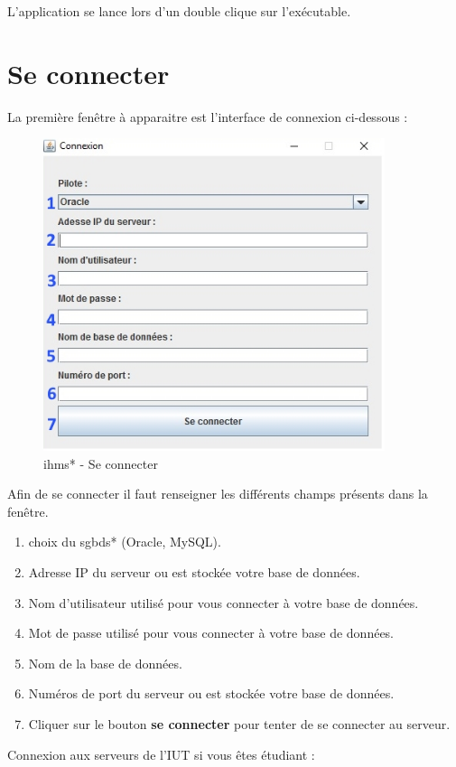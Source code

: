 L'application se lance lors d'un double clique sur l'exécutable.

\section{Se connecter}
La première fen\^etre à apparaitre est l'interface de connexion ci-dessous :
\begin{figure}[!h]
\centering
\includegraphics[width=10cm]{./images/manuel/se_connecter.jpg}
\caption{\glspl{ihm}* - Se connecter}
\label{se_connecter}
\end{figure}

Afin de se connecter il faut renseigner les différents champs présents dans la fen\^etre.

\begin{enumerate}
\item choix du \glspl{sgbd}* (Oracle, MySQL).
\item Adresse IP du serveur ou est stockée votre base de données.
\item Nom d'utilisateur utilisé pour vous connecter à votre base de données. 
\item Mot de passe utilisé pour vous connecter à votre base de données.
\item Nom de la base de données.
\item Numéros de port du serveur ou est stockée votre base de données.
\item Cliquer sur le bouton \textbf{se connecter} pour tenter de se connecter au serveur.
\end{enumerate}

Connexion aux serveurs de l'IUT si vous \^etes étudiant :\\

